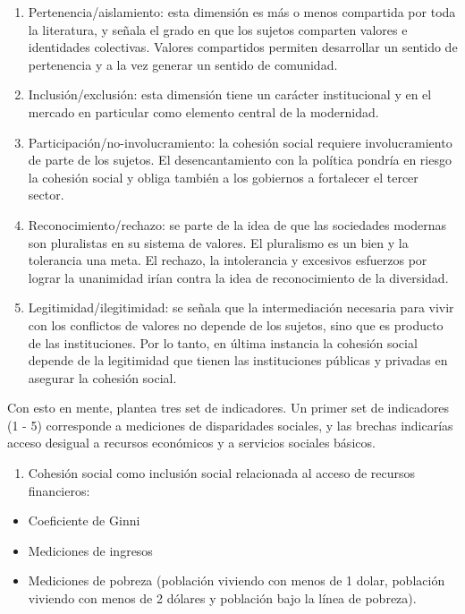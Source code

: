\documentclass[
  12pt,
]{book}
\providecommand{\tightlist}{%
  \setlength{\itemsep}{0pt}\setlength{\parskip}{0pt}}
\begin{document}
\begin{enumerate}
\def\labelenumi{\arabic{enumi}.}
\item
  Pertenencia/aislamiento: esta dimensión es más o menos compartida por toda la literatura, y señala el grado en que los sujetos comparten valores e identidades colectivas. Valores compartidos permiten desarrollar un sentido de pertenencia y a la vez generar un sentido de comunidad.
\item
  Inclusión/exclusión: esta dimensión tiene un carácter institucional y en el mercado en particular como elemento central de la modernidad.
\item
  Participación/no-involucramiento: la cohesión social requiere involucramiento de parte de los sujetos. El desencantamiento con la política pondría en riesgo la cohesión social y obliga también a los gobiernos a fortalecer el tercer sector.
\item
  Reconocimiento/rechazo: se parte de la idea de que las sociedades modernas son pluralistas en su sistema de valores. El pluralismo es un bien y la tolerancia una meta. El rechazo, la intolerancia y excesivos esfuerzos por lograr la unanimidad irían contra la idea de reconocimiento de la diversidad.
\item
  Legitimidad/ilegitimidad: se señala que la intermediación necesaria para vivir con los conflictos de valores no depende de los sujetos, sino que es producto de las instituciones. Por lo tanto, en última instancia la cohesión social depende de la legitimidad que tienen las instituciones públicas y privadas en asegurar la cohesión social.
\end{enumerate}

Con esto en mente, \citet{jenson2010defining} plantea tres set de indicadores. Un primer set de indicadores (1 - 5) corresponde a mediciones de disparidades sociales, y las brechas indicarías acceso desigual a recursos económicos y a servicios sociales básicos.

\begin{enumerate}
\def\labelenumi{\arabic{enumi}.}
\tightlist
\item
  Cohesión social como inclusión social relacionada al acceso de recursos financieros:
\end{enumerate}

\begin{itemize}
\tightlist
\item
  Coeficiente de Ginni
\item
  Mediciones de ingresos
\item
  Mediciones de pobreza (población viviendo con menos de 1 dolar, población viviendo con menos de 2 dólares y población bajo la línea de pobreza).
\end{itemize}
\end{document}

